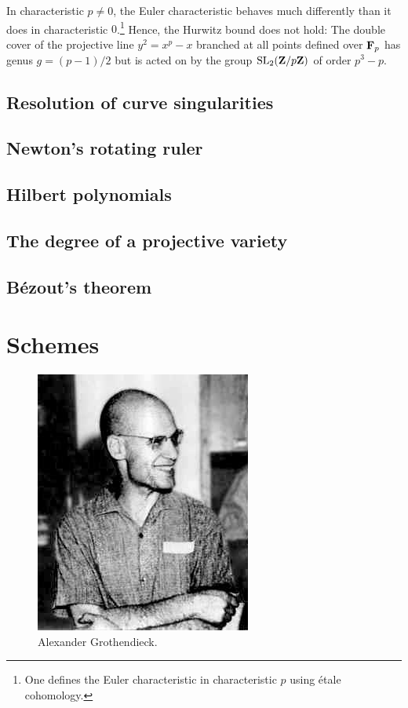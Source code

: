 \documentclass[11pt, oneside,margin=1in]{article}
\begin{document}
\begin{remark}
	In characteristic $p\ne 0$, the Euler characteristic behaves much differently than it does in characteristic $0$.\footnote{One defines the Euler characteristic in characteristic $p$ using \'etale cohomology.} Hence, the Hurwitz bound does not hold: The double cover of the projective line $y^2=x^p-x$ branched at all points defined over $\mathbf F_p$ has genus $g = (p-1)/2$ but is acted on by the group $\operatorname{SL}_{2}(\mathbf Z/p\mathbf Z)$ of order $p^3-p$.
\end{remark}
\subsection{Resolution of curve singularities}
\subsection{Newton's rotating ruler}
\subsection{Hilbert polynomials}
\subsection{The degree of a projective variety}
\subsection{B\'ezout's theorem}


\section{Schemes}
\begin{figure}
\begin{center}
\includegraphics[scale=0.8]{images/groth}
\caption{Alexander Grothendieck.}
\end{center}
\end{figure}
\end{document}
